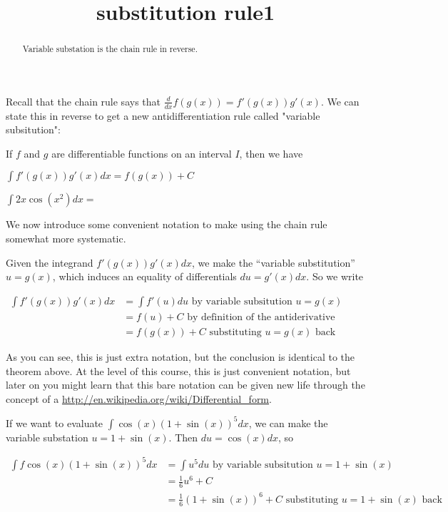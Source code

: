 \documentclass{ximera}
\title{substitution rule1}
\begin{document}
\begin{abstract}
  Variable substation is the chain rule in reverse.
\end{abstract}

\maketitle


Recall that the chain rule says that $\frac{d}{dx} f(g(x)) = f'(g(x))g'(x)$.  We can state this in reverse to get a new antidifferentiation rule called "variable subsitution":

\begin{theorem}
If $f$ and $g$ are differentiable functions on an interval $I$, then we have

$\displaystyle\int f'(g(x))g'(x)dx = f(g(x))+C$
\end{theorem}

\begin{question}
	$\int 2x\cos(x^2) dx=$
\end{question}

We now introduce some convenient notation to make using the chain rule somewhat more systematic.

Given the integrand $f'(g(x))g'(x)dx$, we make the ``variable substitution'' $ u = g(x)$, which induces an equality of differentials $du = g'(x)dx$.  So we write

$\begin{align*}
	\displaystyle \int f'(g(x))g'(x) dx &= \displaystyle \int f'(u) du \text{ by variable subsitution \(u=g(x)\)}\\
	&=f(u)+C \text{ by definition of the antiderivative}\\
	&=f(g(x)) +C \text{ substituting \(u=g(x)\) back}
\end{align*}$

As you can see, this is just extra notation, but the conclusion is identical to the theorem above.  At the level of this course, this is just convenient notation, but later on you might learn that this bare notation can be given new life through the concept of a \href{differential form}{http://en.wikipedia.org/wiki/Differential_form}.

\begin{example}
If we want to evaluate $\displaystyle \int \cos(x)(1+\sin(x))^5 dx$, we can make the variable substation $u = 1+\sin(x)$.  Then $du=\cos(x)dx$, so

$\begin{align*}
	\displaystyle \int f\cos(x)(1+\sin(x))^5 dx &= \displaystyle \int u^5 du \text{ by variable subsitution \(u=1+\sin(x)\)}\\
	&=\frac{1}{6}u^6+C\\
	&=\frac{1}{6}(1+\sin(x))^6 +C \text{ substituting \(u=1+\sin(x)\) back}
\end{align*}$

\end{example}
\end{document}
